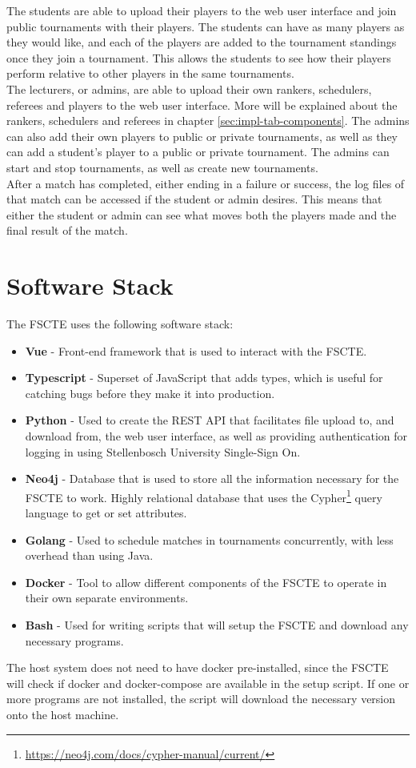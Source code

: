 \documentclass[a4paper, 11pt]{report}
\begin{document}
The students are able to upload their players to the web user interface and join
public tournaments with their players. The students can have as many players as
they would like, and each of the players are added to the tournament standings
once they join a tournament. This allows the students to see how their players
perform relative to other players in the same tournaments. \\

The lecturers, or admins, are able to upload their own rankers, schedulers,
referees and players to the web user interface. More will be explained about the
rankers, schedulers and referees in chapter \ref{sec:impl-tab-components}. The
admins can also add their own players to public or private tournaments, as well
as they can add a student's player to a public or private tournament. The admins
can start and stop tournaments, as well as create new tournaments. \\

After a match has completed, either ending in a failure or success, the log files
of that match can be accessed if the student or admin desires. This means that
either the student or admin can see what moves both the players made and the
final result of the match.

\section{Software Stack}

The FSCTE uses the following software stack:
\begin{itemize}
	\item \textbf{Vue} - Front-end framework that is used to interact with the
	FSCTE.
	\item \textbf{Typescript} - Superset of JavaScript that adds types, which
	is useful for catching bugs before they make it into production.
	\item \textbf{Python} - Used to create the REST API that facilitates
	file upload to, and download from, the web user interface, as well as providing
	authentication for logging in using Stellenbosch University Single-Sign On.
	\item \textbf{Neo4j} - Database that is used to store all the information
	necessary for the FSCTE to work. Highly relational database that uses the
	Cypher\footnote{\url{https://neo4j.com/docs/cypher-manual/current/}} query
	language to get or set attributes.
	\item \textbf{Golang} - Used to schedule matches in tournaments concurrently,
	with less overhead than using Java.
	\item \textbf{Docker} - Tool to allow different components of the FSCTE to
	operate in their own separate environments.
	\item \textbf{Bash} - Used for writing scripts that will setup the FSCTE and
	download any necessary programs.
\end{itemize}
The host system does not need to have docker pre-installed, since the FSCTE will
check if docker and docker-compose are available in the setup script. If one or
more programs are not installed, the script will download the necessary version
onto the host machine.
\end{document}
